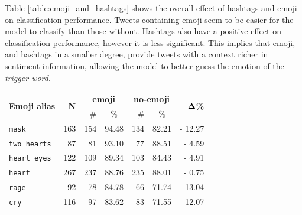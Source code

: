 \documentclass[11pt,a4paper]{article}
\begin{document}
Table \ref{table:emoji_and_hashtags} shows the overall effect of hashtags and
emoji on classification performance. Tweets containing emoji seem to be easier
for the model to classify than those without. Hashtags also have a positive
effect on classification performance, however it is less significant. This
implies that emoji, and hashtags in a smaller degree, provide tweets with a
context richer in sentiment information, allowing the model to better guess the
emotion of the \textit{trigger-word}.


\begin{table}[!h]
    \centering
    \scriptsize
        \begin{tabular}{lrrcrcr}

            \toprule
           \multirow{2}{*}{\textbf{Emoji alias}} & \multirow{2}{*}{\textbf{N}\hspace{0.1cm}} & \multicolumn{2}{c}{\textbf{emoji}} & \multicolumn{2}{c}{\textbf{no-emoji}} &
            \multirow{2}{*}{$\bf{\Delta}$\textbf{\%}} \\
            \cmidrule(lr){3-4}
            \cmidrule(lr){5-6}
                                &     & \#   & \% & \# & \% & \\
            \midrule[0.08em]
            \texttt{mask}       & 163   \hspace{0.1cm} & 154 & 94.48 \hspace{0.1cm} & 134 & 82.21 & - 12.27 \\
          \texttt{two\_hearts}  & 87    \hspace{0.1cm} & 81  & 93.10 \hspace{0.1cm} & 77  & 88.51 & - 4.59  \\
          \texttt{heart\_eyes}  & 122   \hspace{0.1cm} & 109 & 89.34 \hspace{0.1cm} & 103 & 84.43 & - 4.91  \\
          \texttt{heart}        & 267   \hspace{0.1cm} & 237 & 88.76 \hspace{0.1cm} & 235 & 88.01 & - 0.75  \\
          \midrule[0.001em]
          \texttt{rage}         & 92    \hspace{0.1cm} & 78  & 84.78 \hspace{0.1cm} & 66  & 71.74 & - 13.04 \\
          \texttt{cry}          & 116   \hspace{0.1cm} & 97  & 83.62 \hspace{0.1cm} & 83  & 71.55 & - 12.07 \\

\end{tabular}
\end{table}
\end{document}
